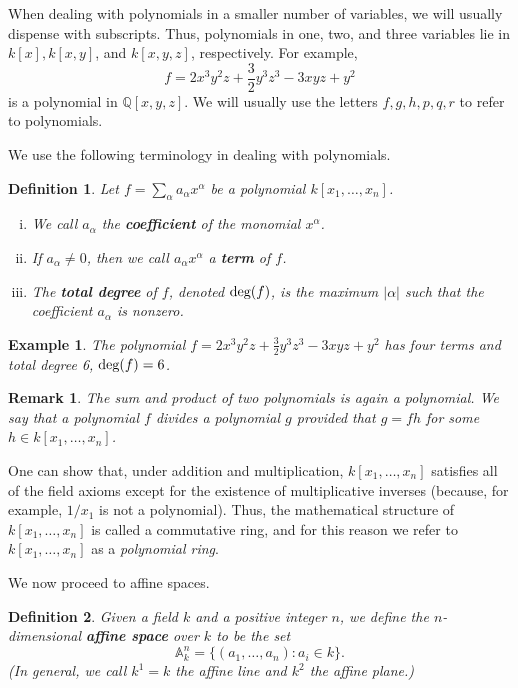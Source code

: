 \documentclass[12pt,reqno]{amsart}
\theoremstyle{plain}
\newtheorem{defi}{Definition}
\newtheorem{rem}{Remark}
\newcommand{\degg}{\textup{deg}}
\newtheorem{ex}{Example}
\newcommand{\qq}{\mathbb Q}
\begin{document}
When dealing with polynomials in a smaller number of variables, we will usually dispense with subscripts. Thus, polynomials in one, two, and three variables lie in $k[x], k[x,y]$, and $k[x,y,z]$, respectively. For example, $$f = 2x^3 y^2 z + \frac{3}{2} y^3 z^3 - 3xyz + y^2$$ is a polynomial in $\qq [x,y,z]$. We will usually use the letters $f, g, h, p, q, r$ to refer to polynomials. 

We use the following terminology in dealing with polynomials.


\begin{defi} Let $f = \sum_{\alpha} a_{\alpha} x^{\alpha}$ be a polynomial $k \left[x_1, \ldots , x_n\right]$.
\begin{enumerate}[(i)]
\item We call $a_\alpha$ the \textup{\textbf{coefficient}} of the monomial $x^{\alpha}$.
\item If $a_\alpha \neq 0$, then we call $a_{\alpha} x^{\alpha}$ a \textup{\textbf{term}} of $f$.
\item The \textup{\textbf{total degree}} of $f$, denoted $\degg (f)$, is the maximum $| \alpha|$ such that the coefficient $a_{\alpha}$ is nonzero. 
\end{enumerate}
\end{defi}
\begin{ex} The polynomial $f= 2x^3 y^2 z + \frac{3}{2} y^3 z^3 - 3xyz +y^2$ has four terms and total degree 6, $\degg (f) = 6$. 
\end{ex}
\begin{rem} The sum and product of two polynomials is again a polynomial. We say that a polynomial $f$ \textit{divides} a polynomial $g$ provided that $g = fh$ for some $h \in k [x_1, \ldots , x_n ]$.
\end{rem}

One can show that, under addition and multiplication, $k \left[x_1, \ldots , x_n\right]$ satisfies all of the field axioms except for the existence of multiplicative inverses (because, for example, $1/x_1$ is not a polynomial). Thus, the mathematical structure of $k \left[x_1, \ldots , x_n\right]$ is called a commutative ring, and for this reason we refer to $k \left[x_1, \ldots , x_n\right]$ as a \textit{polynomial ring}. 

We now proceed to affine spaces. 
\begin{defi} Given a field $k$ and a positive integer $n$, we define the $n$-dimensional \textup{\textbf{affine space}} over $k$ to be the set $$\mathbb{A}_k^n = \{ (a_1, \ldots, a_n ) \colon a_i \in k \}.$$  (In general, we call $k^1 = k$ the \textit{affine line} and $k^2$ the \textit{affine plane}.) 
\end{defi}
\end{document}
